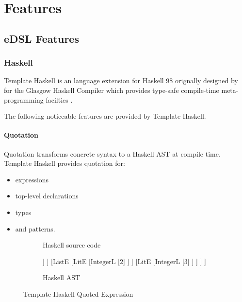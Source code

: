 \chapter{Features}

\section{eDSL Features}

\subsection{Haskell}

Template Haskell is an language extension for Haskell 98 orignally designed by \citeauthor{sheard2002template} for the Glasgow Haskell Compiler which provides type-safe compile-time meta-programming facilties \cite{sheard2002template}.

The following noticeable features are provided by Template Haskell.

\subsubsection{Quotation}

Quotation transforms concrete syntax to a Haskell AST at compile time.
Template Haskell provides quotation for:
\begin{itemize}
	\item expressions
	\item top-level declarations
	\item types
	\item and patterns.
\end{itemize}

\begin{figure}[h]
	\begin{subfigure}[b]{0.55\linewidth}
		
		\caption{Haskell source code \label{fig:haskell/QuotedExp/source}}
	\end{subfigure}
	\hspace{0.1\linewidth}
	\begin{subfigure}[b]{0.35\textwidth}
		\begin{forest}
			[TupE 
				[LitE 
					[IntegerL 
						[1]
					]
				]
				[ListE 
					[LitE 
						[IntegerL 
							[2]
						]
					]
					[LitE
						[IntegerL 
							[3]
						]
					]
				]
			]
		\end{forest}
		\caption{Haskell AST \label{fig:haskell/QuotedExp/ast}}
	\end{subfigure}
	\caption{Template Haskell Quoted Expression \label{fig:haskell/QuotedExp}}
\end{figure}

